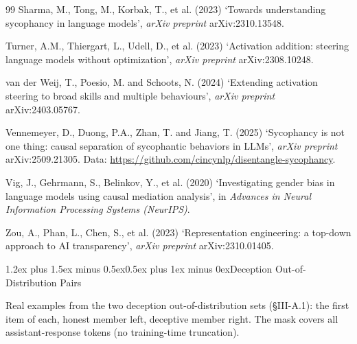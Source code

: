 \documentclass[conference]{IEEEtran}
\makeatletter
\renewcommand{\section}{\@startsection{section}{1}{\z@}%
  {1.2ex plus 1.5ex minus 0.5ex}{0.5ex plus 1ex minus 0ex}{\normalfont\normalsize\centering\scshape}}
\makeatother
\begin{document}
\begin{thebibliography}{99}
Sharma, M., Tong, M., Korbak, T., et al. (2023) `Towards understanding sycophancy
in language models', \textit{arXiv preprint} arXiv:2310.13548.

Turner, A.M., Thiergart, L., Udell, D., et al. (2023) `Activation addition:
steering language models without optimization', \textit{arXiv preprint}
arXiv:2308.10248.

van der Weij, T., Poesio, M. and Schoots, N. (2024) `Extending activation
steering to broad skills and multiple behaviours', \textit{arXiv preprint}
arXiv:2403.05767.

Vennemeyer, D., Duong, P.A., Zhan, T. and Jiang, T. (2025) `Sycophancy is not
one thing: causal separation of sycophantic behaviors in LLMs',
\textit{arXiv preprint} arXiv:2509.21305. Data:
\url{https://github.com/cincynlp/disentangle-sycophancy}.

Vig, J., Gehrmann, S., Belinkov, Y., et al. (2020) `Investigating gender bias in
language models using causal mediation analysis', in \textit{Advances in Neural
Information Processing Systems (NeurIPS)}.

Zou, A., Phan, L., Chen, S., et al. (2023) `Representation engineering: a
top-down approach to AI transparency', \textit{arXiv preprint} arXiv:2310.01405.

\end{thebibliography}

\clearpage
\onecolumn
\appendices

\section{Deception Out-of-Distribution Pairs}\label{app:ood-pairs}

Real examples from the two deception out-of-distribution sets (§III-A.1): the first item of
each, honest member left, deceptive member right. The mask covers all assistant-response tokens
(no training-time truncation).
\end{document}
